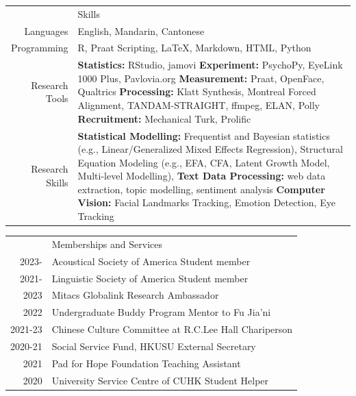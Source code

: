 \documentclass[letterpaper, 11pt]{article}
\newcommand{\headingfont}{\Large\color{MidnightBlue}}
\newenvironment{SectionTableSingleSpace}[1]{
	\renewcommand*{\arraystretch}{1.2}
	\setlength{\tabcolsep}{10pt}
	\begin{longtable}{Rp{6.3in}} & #1 \\[0.6em]}
{\end{longtable}\vspace{-.3cm}}
\begin{document}
\begin{SectionTableSingleSpace}{\headingfont Skills}
Languages &
English, Mandarin, Cantonese\\

\small Programming &
R, Praat Scripting, \LaTeX, Markdown, HTML, Python\\

Research Tools &
\textbf{Statistics:} RStudio, jamovi\newline
\textbf{Experiment:} PsychoPy, EyeLink 1000 Plus, Pavlovia.org\newline
\textbf{Measurement:} Praat, OpenFace, Qualtrics\newline
\textbf{Processing:} Klatt Synthesis, Montreal Forced Alignment, TANDAM-STRAIGHT, ffmpeg, ELAN, Polly\newline
\textbf{Recruitment:} Mechanical Turk, Prolific\\

Research Skills &
\textbf{Statistical Modelling:}{ Frequentist and Bayesian statistics (e.g., Linear/Generalized Mixed Effects Regression)}, Structural Equation Modeling (e.g., EFA, CFA, Latent Growth Model, Multi-level Modelling), \newline
\textbf{Text Data Processing:} web data extraction, topic modelling, sentiment analysis\newline
\textbf{Computer Vision:} Facial Landmarks Tracking, Emotion Detection, Eye Tracking\\
\end{SectionTableSingleSpace}


\begin{SectionTableSingleSpace}{\headingfont Memberships and Services}
2023-&
Acoustical Society of America \hfill Student member\\
2021-&
Linguistic Society of America \hfill Student member\\

2023 &
Mitacs \hfill Globalink Research Ambassador \\
2022&
 Undergraduate Buddy Program \hfill Mentor to Fu Jia'ni \\
2021-23&
Chinese Culture Committee at R.C.Lee Hall \hfill Chariperson\\
2020-21&
Social Service Fund, HKUSU \hfill External Secretary\\
2021&
Pad for Hope Foundation \hfill Teaching Assistant\\
2020&
University Service Centre of CUHK \hfill Student Helper\\
\end{SectionTableSingleSpace}
\end{document}
